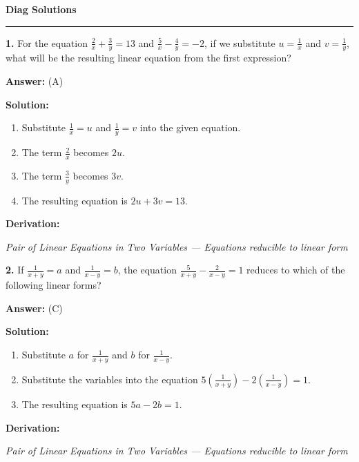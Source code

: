 \documentclass[12pt,a4paper]{exam}
\newcommand{\fitmath}[1]{%
  \sbox{\schmathbox}{$\displaystyle #1$}%
  \ifdim\wd\schmathbox>\linewidth
    \resizebox{\linewidth}{!}{\usebox{\schmathbox}}%
  \else
    \usebox{\schmathbox}%
  \fi}
\begin{document}
\thispagestyle{empty}
\begin{center}
  \textbf{\LARGE Diag Solutions} \\[0.3cm]
  \rule{\textwidth}{0.5pt}
\end{center}

\vspace{0.3cm}

\begin{questions}
\question \textbf{1.} For the equation $\frac{2}{x} + \frac{3}{y} = 13$ and $\frac{5}{x} - \frac{4}{y} = -2$, if we substitute $u = \frac{1}{x}$ and $v = \frac{1}{y}$, what will be the resulting linear equation from the first expression?

\textbf{Answer:}
(A)

\textbf{Solution:}
\begin{enumerate}
  \item Substitute $\frac{1}{x} = u$ and $\frac{1}{y} = v$ into the given equation.
  \item The term $\frac{2}{x}$ becomes $2u$.
  \item The term $\frac{3}{y}$ becomes $3v$.
  \item The resulting equation is $2u + 3v = 13$.
\end{enumerate}
\textbf{Derivation:}
\begin{center}
\fitmath{\begin{aligned}
2(\frac{1}{x}) + 3(\frac{1}{y}) = 13 \\
\implies 2u + 3v = 13
\end{aligned}}
\end{center}
\hfill \textit{Pair of Linear Equations in Two Variables — Equations reducible to linear form}
\vspace{0.3cm}

\question \textbf{2.} If $\frac{1}{x+y} = a$ and $\frac{1}{x-y} = b$, the equation $\frac{5}{x+y} - \frac{2}{x-y} = 1$ reduces to which of the following linear forms?

\textbf{Answer:}
(C)

\textbf{Solution:}
\begin{enumerate}
  \item Substitute $a$ for $\frac{1}{x+y}$ and $b$ for $\frac{1}{x-y}$.
  \item Substitute the variables into the equation $5(\frac{1}{x+y}) - 2(\frac{1}{x-y}) = 1$.
  \item The resulting equation is $5a - 2b = 1$.
\end{enumerate}
\textbf{Derivation:}
\begin{center}
\fitmath{5a - 2b = 1}
\end{center}
\hfill \textit{Pair of Linear Equations in Two Variables — Equations reducible to linear form}
\vspace{0.3cm}


\end{questions}
\end{document}
